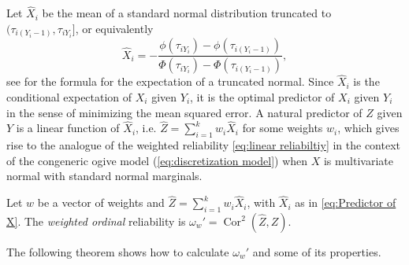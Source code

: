 \documentclass[twoside]{article}
\DeclareMathOperator{\Cor}{Cor}
\begin{document}
Let $\hat{X}_{i}$ be the mean of a standard normal distribution
truncated to $(\tau_{i(Y_{i}-1)},\tau_{iY_{i}}]$, or equivalently
\begin{equation}
\hat{X}_{i}=-\frac{\phi(\tau_{iY_{i}})-\phi(\tau_{i(Y_{i}-1)})}{\Phi(\tau_{iY_{i}})-\Phi(\tau_{i(Y_{i}-1)})},\label{eq:Predictor of X}
\end{equation}
see \citep[Section 10.1]{Johnson1994-ag} for the formula for the
expectation of a truncated normal. Since $\hat{X}_{i}$ is the
conditional expectation of $X_{i}$ given $Y_{i}$, it is the optimal
predictor of $X_{i}$ given $Y_{i}$ in the sense of minimizing the
mean squared error. A natural predictor of $Z$ given $Y$ is a linear
function of $\hat{X}_{i}$, i.e. $\hat{Z} = \sum_{i=1}^{k}w_{i}\hat{X}_{i}$
for some weights $w_{i}$, which gives rise to the analogue of the
weighted reliability \eqref{eq:linear reliabiltiy} in the context of the congeneric ogive model
(\ref{eq:discretization model}) when $X$ is multivariate normal
with standard normal marginals. 
\begin{defn}\label{defn:weighted ordinal reliability}
Let $w$ be a vector of weights and $\hat{Z}=\sum_{i=1}^{k}w_{i}\hat{X}_{i}$, with $\hat{X}_i$ as in \eqref{eq:Predictor of X}. The \textit{weighted ordinal} reliability is $\omega_{w}'=\Cor^2(\hat{Z},Z)$.
\end{defn}
The following theorem shows how to calculate $\omega_{w}'$ and
some of its properties.
\end{document}
